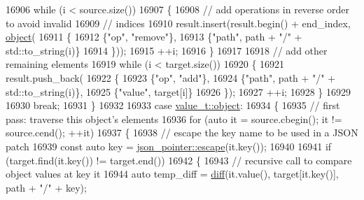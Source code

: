 \begin{DoxyCode}
16906                     \textcolor{keywordflow}{while} (i < source.size())
16907                     \{
16908                         \textcolor{comment}{// add operations in reverse order to avoid invalid}
16909                         \textcolor{comment}{// indices}
16910                         result.insert(result.begin() + end\_index, \hyperlink{classnlohmann_1_1basic__json_aa13f7c0615867542ce80337cbcf13ada}{object}(
16911                         \{
16912                             \{\textcolor{stringliteral}{"op"}, \textcolor{stringliteral}{"remove"}\},
16913                             \{\textcolor{stringliteral}{"path"}, path + \textcolor{stringliteral}{"/"} + std::to\_string(i)\}
16914                         \}));
16915                         ++i;
16916                     \}
16917 
16918                     \textcolor{comment}{// add other remaining elements}
16919                     \textcolor{keywordflow}{while} (i < target.size())
16920                     \{
16921                         result.push\_back(
16922                         \{
16923                             \{\textcolor{stringliteral}{"op"}, \textcolor{stringliteral}{"add"}\},
16924                             \{\textcolor{stringliteral}{"path"}, path + \textcolor{stringliteral}{"/"} + std::to\_string(i)\},
16925                             \{\textcolor{stringliteral}{"value"}, target[i]\}
16926                         \});
16927                         ++i;
16928                     \}
16929 
16930                     \textcolor{keywordflow}{break};
16931                 \}
16932 
16933                 \textcolor{keywordflow}{case} \hyperlink{namespacenlohmann_1_1detail_a1ed8fc6239da25abcaf681d30ace4985aa8cfde6331bd59eb2ac96f8911c4b666}{value\_t::object}:
16934                 \{
16935                     \textcolor{comment}{// first pass: traverse this object's elements}
16936                     \textcolor{keywordflow}{for} (\textcolor{keyword}{auto} it = source.cbegin(); it != source.cend(); ++it)
16937                     \{
16938                         \textcolor{comment}{// escape the key name to be used in a JSON patch}
16939                         \textcolor{keyword}{const} \textcolor{keyword}{auto} key = \hyperlink{classnlohmann_1_1json__pointer_a8abf3577f9a0087f29a233893cdc73ad}{json\_pointer::escape}(it.key());
16940 
16941                         \textcolor{keywordflow}{if} (target.find(it.key()) != target.end())
16942                         \{
16943                             \textcolor{comment}{// recursive call to compare object values at key it}
16944                             \textcolor{keyword}{auto} temp\_diff = \hyperlink{classnlohmann_1_1basic__json_a543bd5f7490de54c875b2c0912dc9a49}{diff}(it.value(), target[it.key()], path + \textcolor{stringliteral}{"/"} + key);

\end{DoxyCode}
